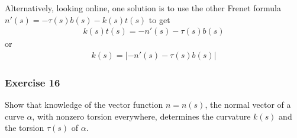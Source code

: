 \documentclass{article}
\begin{document}
	Alternatively, looking online, one solution is to use the other Frenet formula  $n'(s) = -\tau(s) b(s) - k(s) t(s)$ to get
	\begin{gather*}
		k(s) t(s) = -n'(s) - \tau(s) b(s)
	\end{gather*}
	or
	\begin{gather*}
		k(s) = \left| -n'(s) - \tau(s) b(s) \right|
	\end{gather*}
	
	\subsubsection*{Exercise 16}
	Show that knowledge of the vector function $n = n(s)$, the normal vector of a curve $\alpha$, with nonzero torsion everywhere, determines the curvature $k(s)$ and the torsion $\tau(s)$ of $\alpha$.
	
\end{document}
